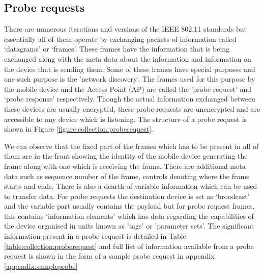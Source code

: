 \subsection{Probe requests}

There are numerous iterations and versions of the IEEE 802.11 standards but essentially all of them operate by exchanging packets of information called `datagrams' or `frames'.
These frames have the information that is being exchanged along with the meta data about the information and information on the device that is sending them.
Some of these frames have special purposes and one such purpose is the 'network discovery'.
The frames used for this purpose by the mobile device and the Access Point (AP) are called the 'probe request' and `probe response' respectively.
Though the actual information exchanged between these devices are usually encrypted, these probe requests are unencrypted and are accessible to any device which is listening.
The structure of a probe request is shown in Figure \ref{figure:collection:proberequest}.

We can observe that the fixed part of the frames which has to be present in all of them are in the front showing the identity of the mobile device generating the frame along with one which is receiving the frame.
There are additional meta data such as sequence number of the frame, controls denoting where the frame starts and ends.
There is also a dearth of variable information which can be used to transfer data.
For probe requests the destination device is set as `broadcast' and the variable part usually contains the payload but for probe request frames, this contains `information elements' which has data regarding the capabilities of the device organised in units known as 'tags' or 'parameter sets'.
The significant information present in a probe request is detailed in Table \ref{table:collection:proberequest} and full list of information available from a probe request is shown in the form of a sample probe request in appendix \ref{appendix:sampleprobe}

